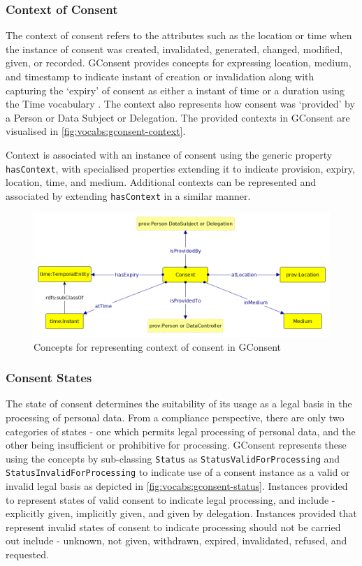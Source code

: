 \subsubsection{Context of Consent}
The context of consent refers to the attributes such as the location or time when the instance of consent was created, invalidated, generated, changed, modified, given, or recorded.
GConsent provides concepts for expressing location, medium, and timestamp to indicate instant of creation or invalidation along with capturing the `expiry' of consent as either a instant of time or a duration using the Time vocabulary \cite{}. The context also represents how consent was `provided' by a Person or Data Subject or Delegation. 
The provided contexts in GConsent are visualised in \autoref{fig:vocabs:gconsent-context}.

Context is associated with an instance of consent using the generic property \texttt{hasContext}, with specialised properties extending it to indicate provision, expiry, location, time, and medium. 
Additional contexts can be represented and associated by extending \texttt{hasContext} in a similar manner.
\begin{figure}[htbp]
    \centering
    \includegraphics[width=0.8\linewidth]{img/gconsent_context.png}
    \caption{Concepts for representing context of consent in GConsent \cite{}}
    \label{fig:vocabs:gconsent-context}
\end{figure}

\subsubsection{Consent States}
The state of consent determines the suitability of its usage as a legal basis in the processing of personal data.
From a compliance perspective, there are only two categories of states - one which permits legal processing of personal data, and the other being insufficient or prohibitive for  processing.
GConsent represents these using the concepts by sub-classing \texttt{Status} as \texttt{StatusValidForProcessing} and \texttt{StatusInvalidForProcessing} to indicate use of a consent instance as a valid or invalid legal basis as depicted in \autoref{fig:vocabs:gconsent-status}.
Instances provided to represent states of valid consent to indicate legal processing, and include - explicitly given, implicitly given, and given by delegation.
Instances provided that represent invalid states of consent to indicate processing should not be carried out include - unknown, not given, withdrawn, expired, invalidated, refused, and requested.

